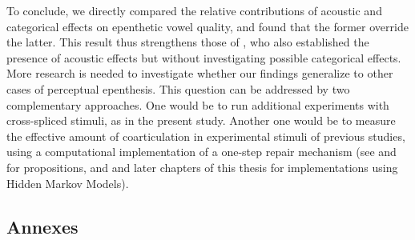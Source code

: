 To conclude, we directly compared the relative contributions of acoustic and categorical effects on epenthetic vowel quality, and found that the former override the latter. This result thus strengthens those of \cite{dupoux2011}, who also established the presence of acoustic effects but without investigating possible categorical effects. More research is needed to investigate whether our findings generalize to other cases of perceptual epenthesis. This question can be addressed by two complementary approaches. One would be to run additional experiments with cross-spliced stimuli, as in the present study. Another one would be to measure the effective amount of coarticulation in experimental stimuli of previous studies, using a computational implementation of a one-step repair mechanism (see \cite{dupoux2011} and \cite{wilson2014} for propositions, and \cite{schatz2016} and later chapters of this thesis for implementations using Hidden Markov Models).

\subsection{Annexes}

